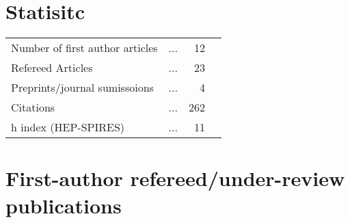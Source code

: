 \documentclass[10pt,floatfix,a4paper]{article}
\begin{document}
\section*{Statisitc}
\begin{tabular}{ l l r l}
	Number of first author articles 	& ... & 12  \\
	Refereed Articles 					& ... & 23  \\
	Preprints/journal sumissoions 		& ... & 4   \\
	Citations 							& ... & 262 \\
	h index (HEP-SPIRES) 				& ... & 11  \\
\end{tabular}

\section*{First-author refereed/under-review publications}
\end{document}
